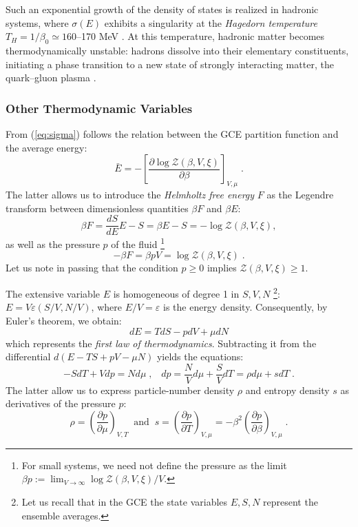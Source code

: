 \documentclass[a4paper,12pt]{amsart}
\theoremstyle{definition}
\theoremstyle{remark}
\begin{document}
Such an exponential growth of the density of states is realized in hadronic systems, where $\sigma(E)$ exhibits a singularity at the {\it Hagedorn temperature} $T_H = 1/\beta_0 \simeq 160$--170 MeV \cite{Hagedorn:1985js}. At this temperature, hadronic matter becomes thermodynamically unstable: hadrons dissolve into their elementary constituents, initiating a phase transition \cite{Cabibbo:1975ig} to a new state of strongly interacting matter, the quark–gluon plasma \cite{Rafelski:2015xej, Pasechnik:2016wkt}.
\subsubsection{Other Thermodynamic Variables}\label{OtTh}
From  (\ref{eq:sigma}) follows the relation between the GCE partition function and the average energy:
\begin{equation}
    \bar{E}  = -\left [\frac{\partial \log \mathcal{Z}(\beta, V,\xi)}{\partial \beta} \right]_{V,\mu} \;.
\end{equation} 
The latter allows us to introduce the {\it Helmholtz free energy} $F$ as the Legendre transform between dimensionless quantities $\beta  F$ and $\beta  E$: 
\begin{equation}\label{Free}
\beta F=\frac{d S}{d E} E -S =\beta E -S= -\log \mathcal{Z}(\beta, V, \xi),
\end{equation}
as well as the pressure $p$ of the fluid  \footnote{For small systems, we need not define the pressure as the limit $\beta p:=\lim_{V\to \infty}\log \mathcal{Z}(\beta, V, \xi)/V $. }
\begin{equation}\label{pressure}
-\beta F = \beta p V = \log \mathcal{Z}(\beta, V,\xi)\;.
\end{equation}
Let us note in passing that the condition $p\geq0$ implies $\mathcal{Z}(\beta, V,\xi)\geq 1$.

The extensive variable $E$ is homogeneous of degree 1 in $S, V, N$ \footnote{Let us recall that in the GCE the state variables $E, S, N$ represent the ensemble averages.}:
$E=V \varepsilon (S/V, N/V)$, where $ E/V = 
\varepsilon$ is the energy density.
Consequently, by Euler's theorem, we  obtain: 
\begin{equation}\label{flaw}
dE=TdS-pdV+\mu dN    
\end{equation}
which represents the {\it first law of thermodynamics}. Subtracting it from the differential $d(E -T S+ pV - \mu N)$  yields the equations: 
\begin{equation}\label{SVN}
-SdT+Vdp=Nd\mu\;,\;\;\;dp=\frac{N}{V}d\mu + \frac{S}{V}dT=\rho d\mu+sdT\;.    
\end{equation}
The latter allow us to express particle-number density $\rho$ and entropy density $s$ as derivatives of the pressure $p$:
\begin{equation}\label{SfromP}
 \rho=\left( \frac{\partial p}{\partial \mu}\right)_{V,T} \;\; \text{and}\;\; s=\left( \frac{\partial p}{\partial T}\right)_{V,\mu}=-\beta^2\left(\frac{\partial p}{\partial \beta}\right)_{V,\mu}\;.
\end{equation}
\end{document}
